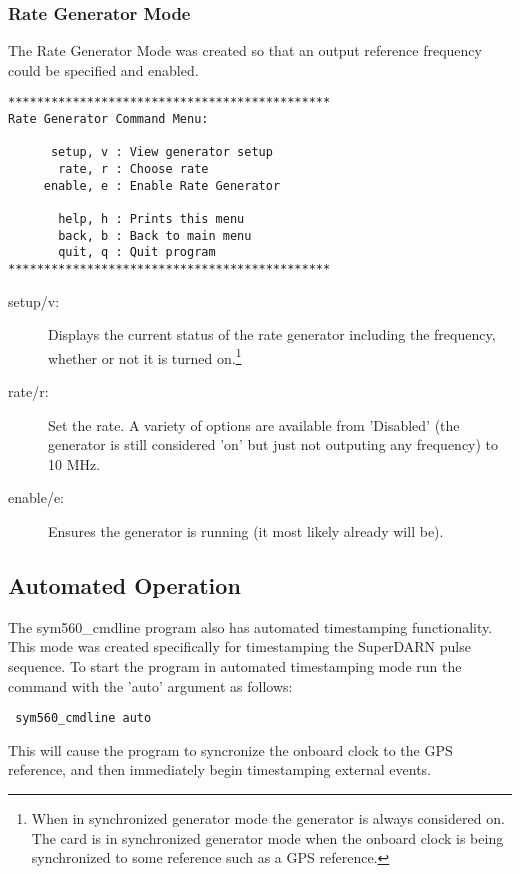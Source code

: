 \documentclass[11pt]{article}
\begin{document}
    \subsubsection{Rate Generator Mode} \label{rategen}
    The Rate Generator Mode was created so that an output reference frequency could be specified and enabled.
    \begin{verbatim}
*********************************************
Rate Generator Command Menu:

      setup, v : View generator setup
       rate, r : Choose rate
     enable, e : Enable Rate Generator

       help, h : Prints this menu
       back, b : Back to main menu
       quit, q : Quit program
*********************************************
    \end{verbatim}
    \begin{description}
        \item [setup/v:] Displays the current status of the rate generator including the frequency, whether or not it is turned on.\footnote{When in synchronized generator mode the generator is always considered on. The card is in synchronized generator mode when the onboard clock is being synchronized to some reference such as a GPS reference.}
        \item [rate/r:] Set the rate. A variety of options are available from 'Disabled' (the generator is still considered 'on' but just not outputing any frequency) to 10 MHz.
        \item [enable/e:] Ensures the generator is running (it most likely already will be).
    \end{description}




    \subsection{Automated Operation} \label{autoapp}
    The sym560\_cmdline program also has automated timestamping functionality. This mode was created specifically for timestamping the SuperDARN pulse sequence. To start the program in automated timestamping mode run the command with the 'auto' argument as follows:
    \begin{verbatim}
 sym560_cmdline auto
    \end{verbatim}
    This will cause the program to syncronize the onboard clock to the GPS reference, and then immediately begin timestamping external events.
\end{document}
